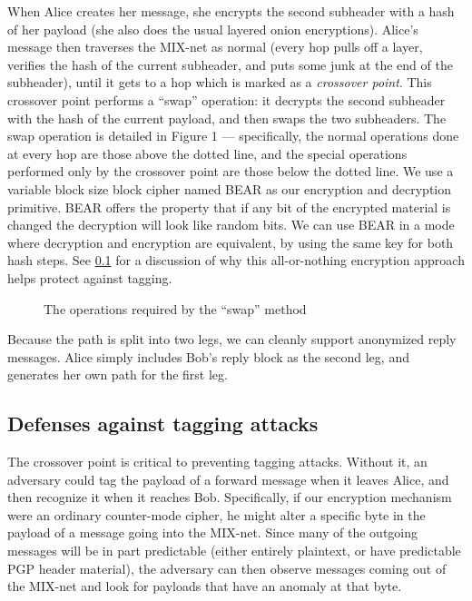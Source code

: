 \documentclass{llncs}
\begin{document}
When Alice creates her message, she encrypts the second subheader
with a hash of her payload (she also does the usual layered onion
encryptions). Alice's message then traverses the MIX-net as normal (every
hop pulls off a layer, verifies the hash of the current subheader,
and puts some junk at the end of the subheader), until it gets to a
hop which is marked as a \emph{crossover point}. This crossover point
performs a ``swap'' operation: it decrypts the second subheader with
the hash of the current payload, and then swaps the two subheaders. The
swap operation is detailed in Figure 1 --- specifically, the normal
operations done at every hop are those above the dotted line, and the
special operations performed only by the crossover point are those below
the dotted line.  We use a variable block size block cipher named BEAR
\cite{BEAR} as our encryption and decryption primitive. BEAR offers
the property that if any bit of the encrypted material is changed the
decryption will look like random bits. We can use BEAR in a mode where
decryption and encryption are equivalent, by using the same key for
both hash steps. See \ref{subsec:tagging} for a discussion of why this
all-or-nothing encryption approach helps protect against tagging.

\begin{figure}
\begin{center}
\caption{The operations required by the ``swap'' method} 
\end{center}
\end{figure}

Because the path is split into two legs, we can cleanly support anonymized
reply messages. Alice simply includes Bob's reply block as the second leg,
and generates her own path for the first leg.

\subsection{Defenses against tagging attacks}
\label{subsec:tagging}

The crossover point is critical to preventing tagging attacks. Without
it, an adversary could tag the payload of a forward message when it
leaves Alice, and then recognize it when it reaches Bob. Specifically,
if our encryption mechanism were an ordinary counter-mode cipher, he
might alter a specific byte in the payload of a message going into the
MIX-net. Since many of the outgoing messages will be in part predictable
(either entirely plaintext, or have predictable PGP header material),
the adversary can then observe messages coming out of the MIX-net and
look for payloads that have an anomaly at that byte.
\end{document}
